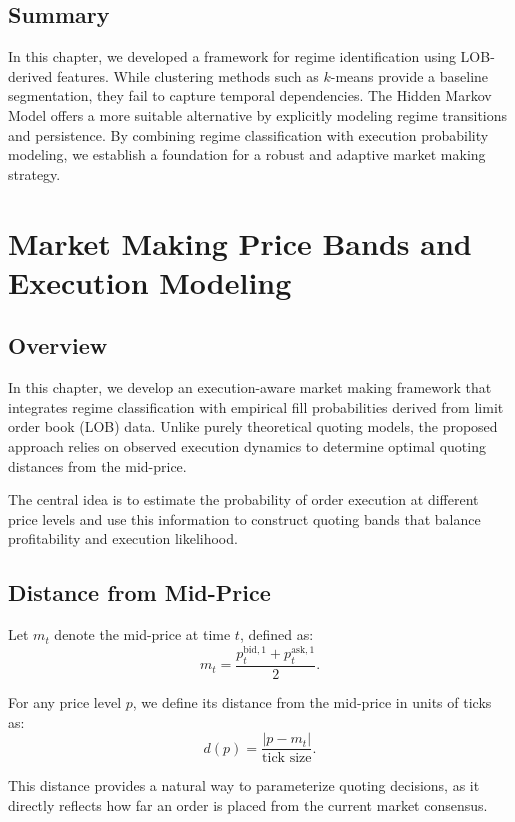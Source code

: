 \documentclass[12pt,a4paper]{report}
\begin{document}
\section{Summary}

In this chapter, we developed a framework for regime identification using LOB-derived features. While clustering methods such as $k$-means provide a baseline segmentation, they fail to capture temporal dependencies. The Hidden Markov Model offers a more suitable alternative by explicitly modeling regime transitions and persistence. By combining regime classification with execution probability modeling, we establish a foundation for a robust and adaptive market making strategy.

\chapter{Market Making Price Bands and Execution Modeling}

\section{Overview}

In this chapter, we develop an execution-aware market making framework that integrates regime classification with empirical fill probabilities derived from limit order book (LOB) data. Unlike purely theoretical quoting models, the proposed approach relies on observed execution dynamics to determine optimal quoting distances from the mid-price.

The central idea is to estimate the probability of order execution at different price levels and use this information to construct quoting bands that balance profitability and execution likelihood.

\section{Distance from Mid-Price}

Let $m_t$ denote the mid-price at time $t$, defined as:
\[
m_t = \frac{p_t^{\text{bid},1} + p_t^{\text{ask},1}}{2}.
\]

For any price level $p$, we define its distance from the mid-price in units of ticks as:
\[
d(p) = \frac{|p - m_t|}{\text{tick size}}.
\]

This distance provides a natural way to parameterize quoting decisions, as it directly reflects how far an order is placed from the current market consensus.
\end{document}
